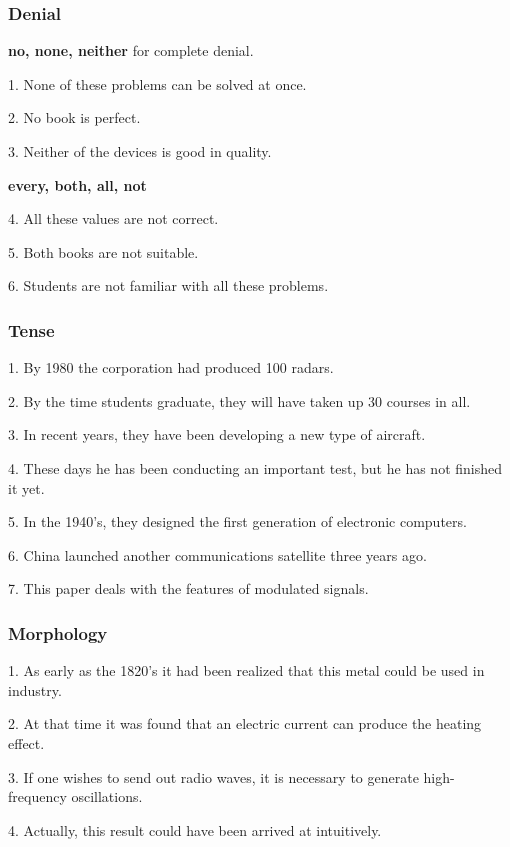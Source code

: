 \documentclass[a4paper,twocolumn,10pt]{article}
\begin{document}
\begin{CJK}{UTF8}{gkai}
	\subsubsection{Denial}

	{\bf no, none, neither} for complete denial.

	1. None of these problems can be solved at once.

	2. No book is perfect.

	3. Neither of the devices is good in quality.

	{\bf every, both, all, not}

	4. All these values are not correct.

	5. Both books are not suitable.

	6. Students are not familiar with all these problems.

	\subsubsection{Tense}

	1. By 1980 the corporation had produced 100 radars.

	2. By the time students graduate, they will have taken up 30 courses in all.

	3. In recent years, they have been developing a new type of aircraft.

	4. These days he has been conducting an important test, but he has not finished it yet.

	5. In the 1940's, they designed the first generation of electronic computers.

	6. China launched another communications satellite three years ago.

	7. This paper deals with the features of modulated signals.

	\subsubsection{Morphology}

	1. As early as the 1820's it had been realized that this metal could be used in industry.

	2. At that time it was found that an electric current can produce the heating effect.

	3. If one wishes to send out radio waves, it is necessary to generate high-frequency oscillations.

	4. Actually, this result could have been arrived at intuitively.


\end{CJK}
\end{document}
